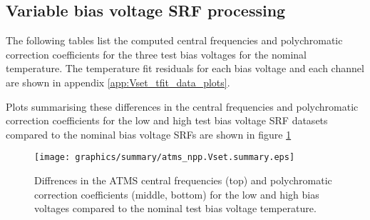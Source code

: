 \subsection{Variable bias voltage SRF processing}
The following tables list the computed central frequencies and polychromatic correction coefficients for the three test bias voltages for the nominal temperature. The temperature fit residuals for each bias voltage and each channel are shown in appendix \ref{app:Vset_tfit_data_plots}.

Plots summarising these differences in the central frequencies and polychromatic correction coefficients for the low and high test bias voltage SRF datasets compared to the nominal bias voltage SRFs are shown in figure \ref{fig:Vset.summary}

\begin{figure}[H]
  \label{fig:Vset.summary}
  \centering
  \texttt{[image: graphics/summary/atms\_npp.Vset.summary.eps]}
  \caption{Diffrences in the ATMS central frequencies (top) and polychromatic correction coefficients (middle, bottom) for the low and high bias voltages compared to the nominal test bias voltage temperature.}
\end{figure}

